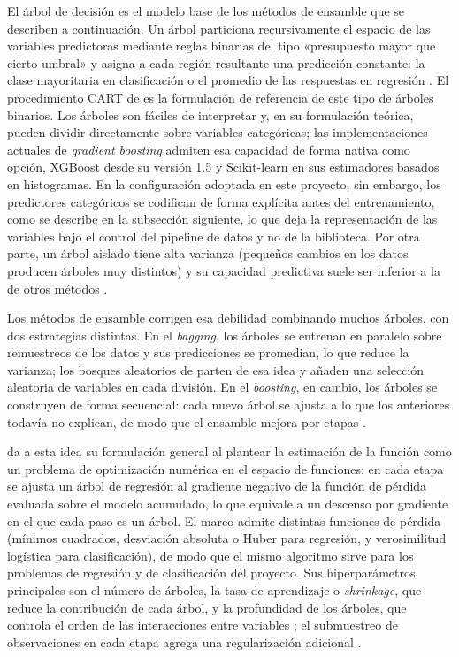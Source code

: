 El árbol de decisión es el modelo base de los métodos de ensamble que se describen a continuación. Un árbol particiona recursivamente el espacio de las variables predictoras mediante reglas binarias del tipo «presupuesto mayor que cierto umbral» y asigna a cada región resultante una predicción constante: la clase mayoritaria en clasificación o el promedio de las respuestas en regresión \parencite{Hastie2009, James2021}. El procedimiento CART de \textcite{Breiman1984} es la formulación de referencia de este tipo de árboles binarios. Los árboles son fáciles de interpretar y, en su formulación teórica, pueden dividir directamente sobre variables categóricas; las implementaciones actuales de \textit{gradient boosting} admiten esa capacidad de forma nativa como opción, XGBoost desde su versión 1.5 y Scikit-learn en sus estimadores basados en histogramas. En la configuración adoptada en este proyecto, sin embargo, los predictores categóricos se codifican de forma explícita antes del entrenamiento, como se describe en la subsección siguiente, lo que deja la representación de las variables bajo el control del pipeline de datos y no de la biblioteca. Por otra parte, un árbol aislado tiene alta varianza (pequeños cambios en los datos producen árboles muy distintos) y su capacidad predictiva suele ser inferior a la de otros métodos \parencite{James2021}.

Los métodos de ensamble corrigen esa debilidad combinando muchos árboles, con dos estrategias distintas. En el \textit{bagging}, los árboles se entrenan en paralelo sobre remuestreos de los datos y sus predicciones se promedian, lo que reduce la varianza; los bosques aleatorios de \textcite{Breiman2001} parten de esa idea y añaden una selección aleatoria de variables en cada división. En el \textit{boosting}, en cambio, los árboles se construyen de forma secuencial: cada nuevo árbol se ajusta a lo que los anteriores todavía no explican, de modo que el ensamble mejora por etapas \parencite{Hastie2009, James2021}.

\textcite{Friedman2001} da a esta idea su formulación general al plantear la estimación de la función como un problema de optimización numérica en el espacio de funciones: en cada etapa se ajusta un árbol de regresión al gradiente negativo de la función de pérdida evaluada sobre el modelo acumulado, lo que equivale a un descenso por gradiente en el que cada paso es un árbol. El marco admite distintas funciones de pérdida (mínimos cuadrados, desviación absoluta o Huber para regresión, y verosimilitud logística para clasificación), de modo que el mismo algoritmo sirve para los problemas de regresión y de clasificación del proyecto. Sus hiperparámetros principales son el número de árboles, la tasa de aprendizaje o \textit{shrinkage}, que reduce la contribución de cada árbol, y la profundidad de los árboles, que controla el orden de las interacciones entre variables \parencite{James2021}; el submuestreo de observaciones en cada etapa agrega una regularización adicional \parencite{Hastie2009}.

